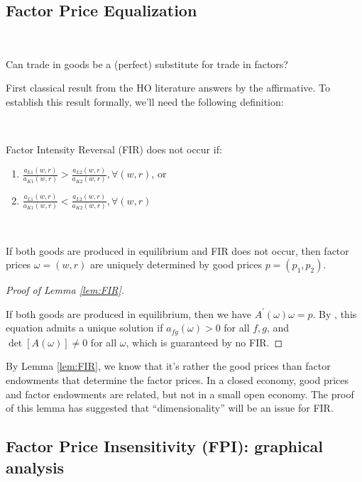 \subsection{Factor Price Equalization}

\begin{question}
    \

    Can trade in goods be a (perfect) substitute for trade in factors?
\end{question}
First classical result from the HO literature answers by the affirmative.
To establish this result formally, we'll need the following definition:

\begin{definition}\label{def:FIR}
    \

    Factor Intensity Reversal (FIR) does not occur if:
    \begin{enumerate}
        \item $\frac{a_{L1}(w,r)}{a_{K1}(w,r)} > \frac{a_{L2}(w,r)}{a_{K2}(w,r)}, \forall (w,r)$, or
        \item $\frac{a_{L1}(w,r)}{a_{K1}(w,r)} < \frac{a_{L2}(w,r)}{a_{K2}(w,r)}, \forall (w,r)$
    \end{enumerate}
\end{definition}

\begin{lemma}\label{lem:FIR}
    \
    
    If both goods are produced in equilibrium and FIR does not occur,
    then factor prices $\omega = (w,r)$ are uniquely determined by good
    prices $p = (p_1, p_2)$.
\end{lemma}
\begin{proof}[Proof of Lemma \ref{lem:FIR}]
    \

    If both goods are produced in equilibrium, then we have $A^{\prime} (\omega) \omega = p$.
    By \cite{gale1965}, this equation admits a unique solution if
    $a_{fg}(\omega) > 0$ for all $f,g$, and $\det[A(\omega)] \neq 0$ for all $\omega$,
    which is guaranteed by no FIR.
\end{proof}

By Lemma \ref{lem:FIR}, we know that it's rather the good prices than factor endowments that determine the factor prices.
In a closed economy, good prices and factor endowments are related, but not in a small open economy.
The proof of this lemma has suggested that ``dimensionality'' will be an issue for FIR.

\subsection{Factor Price Insensitivity (FPI): graphical analysis}

